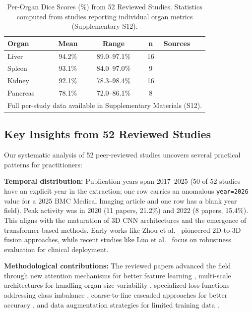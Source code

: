 \documentclass[conference]{IEEEtran}
\begin{document}
\begin{table}[!htb]
\centering
\small
\caption{Per-Organ Dice Scores (\%) from 52 Reviewed Studies. Statistics computed from studies reporting individual organ metrics (Supplementary S12).}
\label{tab:synthesized_dice}
\begin{tabular}{@{}lcccl@{}}
\toprule
\textbf{Organ} & \textbf{Mean} & \textbf{Range} & \textbf{n} & \textbf{Sources} \\
\midrule
Liver & 94.2\% & 89.0--97.1\% & 16 & \cite{kakeya2018ujapa, amjad2022general, gibson2018densevnet} \\
Spleen & 93.1\% & 84.0--97.0\% & 9 & \cite{amjad2022general, gibson2018densevnet} \\
Kidney & 92.1\% & 78.3--98.4\% & 16 & \cite{kakeya2018ujapa, isensee2021nnunet} \\
Pancreas & 78.1\% & 72.0--86.1\% & 8 & \cite{kakeya2018ujapa, oktay2018attention} \\
\bottomrule
\multicolumn{5}{l}{\footnotesize Full per-study data available in Supplementary Materials (S12).}
\end{tabular}
\end{table}

\subsection{Key Insights from 52 Reviewed Studies}

Our systematic analysis of 52 peer-reviewed studies uncovers several practical patterns for practitioners:

\textbf{Temporal distribution:} Publication years span 2017--2025 (50 of 52 studies have an explicit year in the extraction; one row carries an anomalous \texttt{year=2026} value for a 2025 BMC Medical Imaging article and one row has a blank year field). Peak activity was in 2020 (11 papers, 21.2\%) and 2022 (8 papers, 15.4\%). This aligns with the maturation of 3D CNN architectures and the emergence of transformer-based methods. Early works like Zhou et al.\ \cite{zhou2017deep} pioneered 2D-to-3D fusion approaches, while recent studies like Luo et al.\ \cite{luo2024raos} focus on robustness evaluation for clinical deployment.

\textbf{Methodological contributions:} The reviewed papers advanced the field through new attention mechanisms for better feature learning \cite{liu2020attention, zhu2019anatomynet}, multi-scale architectures for handling organ size variability \cite{zhao2020mss, roth2018cascaded}, specialized loss functions addressing class imbalance \cite{shen2018dice, rister2018iou}, coarse-to-fine cascaded approaches for better accuracy \cite{roth2017hierarchical, lin2021kidney}, and data augmentation strategies for limited training data \cite{pan2023adversarial}.
\end{document}
